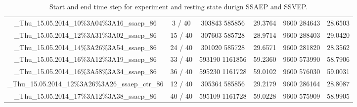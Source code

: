 \documentclass[]{article}
\begin{document}
\begin{table}[H]
\begin{center}
\begin{tabular}{cc|cccc}
\_Thu\_15.05.2014\_10\%3A04\%3A16\_ssaep\_86      &  3 / 40 & 303843  585856 & 29.3764 & 9600 284643 & 28.6503 \\
\_Thu\_15.05.2014\_12\%3A31\%3A02\_ssaep\_86      & 15 / 40 & 307603  585728 & 28.9714 & 9600 288403 & 29.0420 \\
\_Thu\_15.05.2014\_14\%3A26\%3A54\_ssaep\_86      & 24 / 40 & 301020  585728 & 29.6571 & 9600 281820 & 28.3562 \\
\_Thu\_15.05.2014\_16\%3A12\%3A19\_ssaep\_86      & 33 / 40 & 593190 1161856 & 59.2360 & 9600 573990 & 58.7906 \\
\_Thu\_15.05.2014\_16\%3A58\%3A34\_ssaep\_86      & 36 / 40 & 595230 1161728 & 59.0102 & 9600 576030 & 59.0031 \\ \_Thu\_15.05.2014\_12\%3A26\%3A26\_ssaep\_ctr\_86 & 12 / 40 & 305364  585856 & 29.2179 & 9600 286164 & 28.8087 \\
\_Thu\_15.05.2014\_17\%3A12\%3A38\_ssaep\_86      & 40 / 40 & 595109 1161728 & 59.0228 & 9600 575909 & 58.9905
\end{tabular}
\end{center}
\caption{Start and end time step for experiment and resting state durign SSAEP and SSVEP.}
\end{table}

\end{document}
